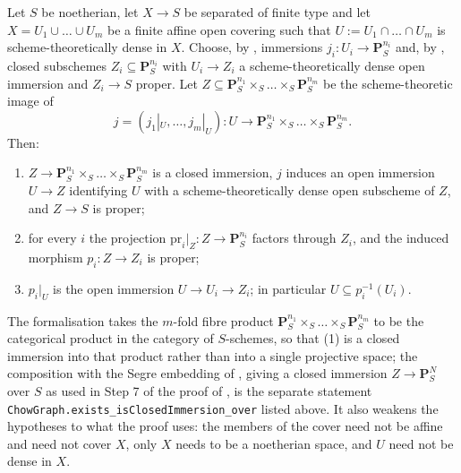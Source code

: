 \begin{lemma}\label{lem:chow-graph}
\leanok
Let $S$ be noetherian, let $X\to S$ be separated of finite type and let
$X=U_1\cup\dots\cup U_m$ be a finite affine open covering such that
$U:=U_1\cap\dots\cap U_m$ is scheme-theoretically dense in $X$.  Choose, by
, immersions
$j_i\colon U_i\to\mathbf P^{n_i}_S$ and, by ,
closed subschemes $Z_i\subseteq\mathbf P^{n_i}_S$ with $U_i\to Z_i$ a
scheme-theoretically dense open immersion and $Z_i\to S$ proper.  Let
$Z\subseteq\mathbf P^{n_1}_S\times_S\dots\times_S\mathbf P^{n_m}_S$ be the
scheme-theoretic image of
\[
  j=(j_1|_U,\dots,j_m|_U)\colon U
  \longrightarrow\mathbf P^{n_1}_S\times_S\dots\times_S\mathbf P^{n_m}_S .
\]
Then:
\begin{enumerate}
  \item $Z\to\mathbf P^{n_1}_S\times_S\dots\times_S\mathbf P^{n_m}_S$ is a
  closed immersion, $j$ induces an open immersion $U\to Z$ identifying $U$ with
  a scheme-theoretically dense open subscheme of $Z$, and $Z\to S$ is proper;
  \item for every $i$ the projection $\mathrm{pr}_i|_Z\colon
  Z\to\mathbf P^{n_i}_S$ factors through $Z_i$, and the induced morphism
  $p_i\colon Z\to Z_i$ is proper;
  \item $p_i|_U$ is the open immersion $U\to U_i\to Z_i$; in particular
  $U\subseteq p_i^{-1}(U_i)$.
\end{enumerate}

The formalisation takes the $m$-fold fibre product
$\mathbf P^{n_1}_S\times_S\dots\times_S\mathbf P^{n_m}_S$ to be the categorical
product in the category of $S$-schemes, so that (1) is a closed immersion into
that product rather than into a single projective space; the composition with
the Segre embedding of , giving a closed immersion
$Z\to\mathbf P^N_S$ over $S$ as used in Step 7 of the proof of
, is the separate statement
\texttt{ChowGraph.exists\_isClosedImmersion\_over} listed above.  It also
weakens the hypotheses to what the proof uses:
the members of the cover need not be affine and need not cover $X$, only $X$
needs to be a noetherian space, and $U$ need not be dense in $X$.
\end{lemma}
